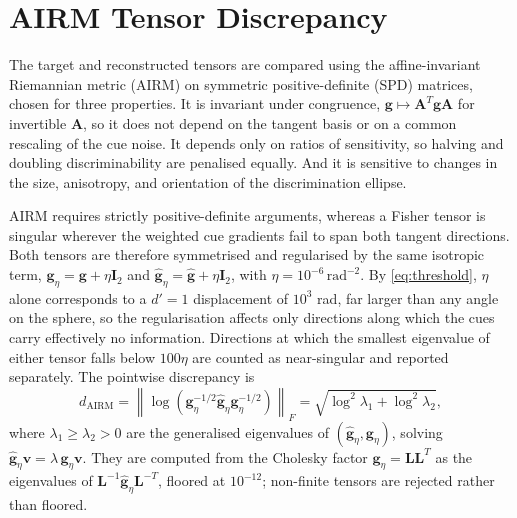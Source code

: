 \documentclass[journal]{IEEEtran}
\begin{document}
\section{AIRM Tensor Discrepancy}
The target and reconstructed tensors are compared using the affine-invariant Riemannian metric (AIRM) on symmetric positive-definite (SPD) matrices, chosen for three properties. It is invariant under congruence, \(\mathbf g\mapsto\mathbf A^T\mathbf g\mathbf A\) for invertible \(\mathbf A\), so it does not depend on the tangent basis or on a common rescaling of the cue noise. It depends only on ratios of sensitivity, so halving and doubling discriminability are penalised equally. And it is sensitive to changes in the size, anisotropy, and orientation of the discrimination ellipse.

AIRM requires strictly positive-definite arguments, whereas a Fisher tensor is singular wherever the weighted cue gradients fail to span both tangent directions. Both tensors are therefore symmetrised and regularised by the same isotropic term, \(\mathbf{g}_{\eta}=\mathbf{g}+\eta\mathbf{I}_2\) and \(\widehat{\mathbf{g}}_{\eta}=\widehat{\mathbf{g}}+\eta\mathbf{I}_2\), with \(\eta=10^{-6}\,\mathrm{rad}^{-2}\). By \eqref{eq:threshold}, \(\eta\) alone corresponds to a \(d'=1\) displacement of \(10^3\) rad, far larger than any angle on the sphere, so the regularisation affects only directions along which the cues carry effectively no information. Directions at which the smallest eigenvalue of either tensor falls below \(100\eta\) are counted as near-singular and reported separately. The pointwise discrepancy is
\begin{equation}
 d_{\mathrm{AIRM}}
 =
 \left\|\log\!\left(
 \mathbf{g}_{\eta}^{-1/2}
 \widehat{\mathbf{g}}_{\eta}
 \mathbf{g}_{\eta}^{-1/2}
 \right)\right\|_F
 =\sqrt{\log^2\lambda_1+\log^2\lambda_2},
\end{equation}
where \(\lambda_1\ge\lambda_2>0\) are the generalised eigenvalues of \((\widehat{\mathbf{g}}_{\eta},\mathbf{g}_{\eta})\), solving \(\widehat{\mathbf g}_\eta\mathbf v=\lambda\,\mathbf g_\eta\mathbf v\). They are computed from the Cholesky factor \(\mathbf g_\eta=\mathbf L\mathbf L^T\) as the eigenvalues of \(\mathbf L^{-1}\widehat{\mathbf g}_{\eta}\mathbf L^{-T}\), floored at \(10^{-12}\); non-finite tensors are rejected rather than floored.
\end{document}
